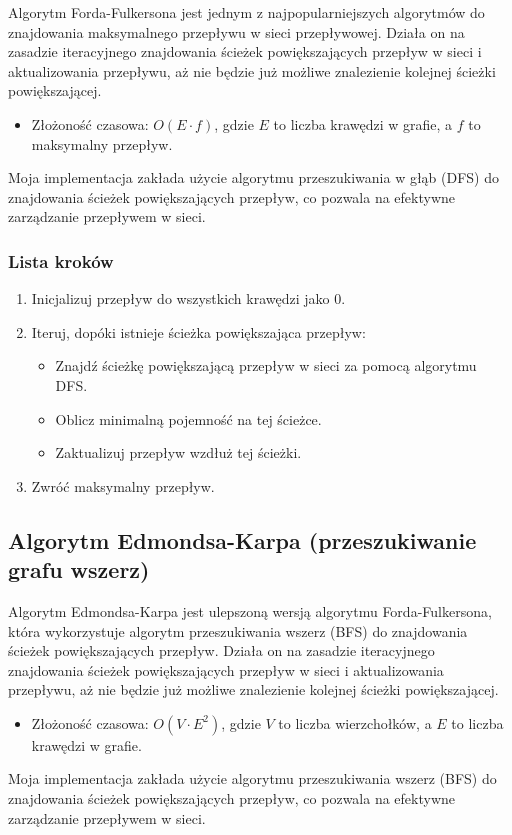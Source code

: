 \documentclass{article}
\begin{document}
Algorytm Forda-Fulkersona jest jednym z najpopularniejszych algorytmów do znajdowania maksymalnego przepływu w sieci przepływowej.
Działa on na zasadzie iteracyjnego znajdowania ścieżek powiększających przepływ w sieci i aktualizowania przepływu, aż nie będzie już możliwe znalezienie kolejnej ścieżki powiększającej.
\begin{itemize}
    \item Złożoność czasowa: $O(E \cdot f)$, gdzie $E$ to liczba krawędzi w grafie, a $f$ to maksymalny przepływ.
\end{itemize}

Moja implementacja zakłada użycie algorytmu przeszukiwania w głąb (DFS) do znajdowania ścieżek powiększających przepływ, co pozwala na efektywne zarządzanie przepływem w sieci.
\subsubsection{Lista kroków}
\begin{enumerate}
    \item Inicjalizuj przepływ do wszystkich krawędzi jako 0.
    \item Iteruj, dopóki istnieje ścieżka powiększająca przepływ:
    \begin{itemize}
        \item Znajdź ścieżkę powiększającą przepływ w sieci za pomocą algorytmu DFS.
        \item Oblicz minimalną pojemność na tej ścieżce.
        \item Zaktualizuj przepływ wzdłuż tej ścieżki.
    \end{itemize}
    \item Zwróć maksymalny przepływ.
\end{enumerate}

\subsection{Algorytm Edmondsa-Karpa (przeszukiwanie grafu wszerz)}
Algorytm Edmondsa-Karpa jest ulepszoną wersją algorytmu Forda-Fulkersona, która wykorzystuje algorytm przeszukiwania wszerz (BFS) do znajdowania ścieżek powiększających przepływ.
Działa on na zasadzie iteracyjnego znajdowania ścieżek powiększających przepływ w sieci i aktualizowania przepływu, aż nie będzie już możliwe znalezienie kolejnej ścieżki powiększającej.
\begin{itemize}
    \item Złożoność czasowa: $O(V \cdot E^2)$, gdzie $V$ to liczba wierzchołków, a $E$ to liczba krawędzi w grafie.
\end{itemize}
Moja implementacja zakłada użycie algorytmu przeszukiwania wszerz (BFS) do znajdowania ścieżek powiększających przepływ, co pozwala na efektywne zarządzanie przepływem w sieci.
\end{document}
